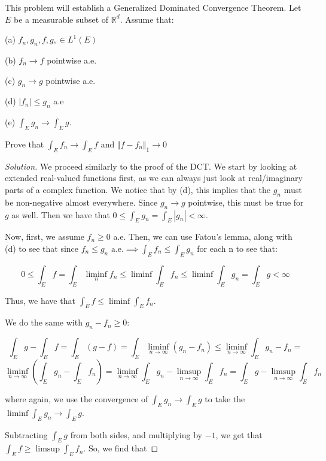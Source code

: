 \documentclass[10pt]{article}
\newenvironment{problem}[2][Problem]{\begin{trivlist}
\item[\hskip \labelsep {\bfseries #1}\hskip \labelsep {\bfseries #2.}]}{\end{trivlist}}
\begin{document}
\begin{problem}{4.5.27}

This problem will establish a Generalized Dominated Convergence Theorem. Let $E$ be a measurable subset of $\mathbb{R}^d$. Assume that:

(a) $f_n, g_n, f,g, \in L^1(E)$

(b) $f_n \to f$ pointwise a.e.

(c) $g_n \to g$ pointwise a.e.

(d) $|f_n| \leq g_n$ a.e

(e) $\int_E g_n \to \int_E g$.


Prove that $\int_E f_n \to \int_E f$ and $\Vert f - f_n \Vert_1 \to 0$

\end{problem}

\begin{proof}[Solution]

We proceed similarly to the proof of the DCT. We start by looking at extended real-valued functions first, as we can always just look at real/imaginary parts of a complex function. We notice that by (d), this implies that the $g_n$ must be non-negative almost everywhere. Since $g_n \to g$ pointwise, this must be true for $g$ as well. Then we have that $0 \leq \int_E g_n = \int_E |g_n| < \infty$.

Now, first, we assume $f_n \geq 0$ a.e. Then, we can use Fatou's lemma, along with (d) to see that since $f_n \leq g_n \text{ a.e.} \implies \int_E f_n \leq \int_E g_n$ for each n to see that:

$$ 0 \leq \int_E f = \int_E \liminf_n f_n \leq \liminf \int_E f_n \leq \liminf \int_E g_n  =\int_E g < \infty$$

Thus, we have that $\int_E f \leq \liminf \int_E f_n $.

We do the same with $g_n - f_n \geq 0$:

$$\int_E g - \int_E f = \int_E (g-f) = \int_E \liminf_{n \to \infty} (g_n - f_n) \leq \liminf_{n \to \infty} \int_E g_n - f_n = $$
$$\liminf_{n \to \infty} \left( \int_E g_n - \int_E f_n \right) = \liminf_{n \to \infty} \int_E g_n - \limsup_{n \to \infty} \int_E f_n = \int_E g - \limsup_{n \to \infty} \int_E f_n$$

where again, we use the convergence of $\int_E g_n \to \int_E g$ to take the $\liminf \int_E g_n \to \int_E g$.

Subtracting $\int_E g$ from both sides, and multiplying by $-1$, we get that $\int_E f \geq \limsup \int_E f_n$. So, we find that 


\end{proof}
\end{document}
